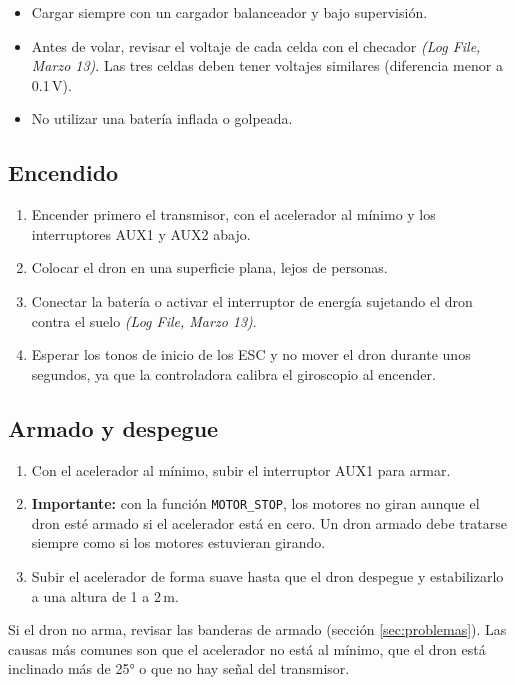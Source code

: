 \documentclass[11pt,letterpaper]{article}
\newcommand{\logref}[1]{\textit{(Log File, #1)}}
\begin{document}
\begin{itemize}[nosep]
    \item Cargar siempre con un cargador balanceador y bajo supervisión.
    \item Antes de volar, revisar el voltaje de cada celda con el checador \logref{Marzo 13}. Las tres celdas deben tener voltajes similares (diferencia menor a 0.1\,V).
    \item No utilizar una batería inflada o golpeada.
\end{itemize}

\subsection{Encendido}
\begin{enumerate}[nosep]
    \item Encender primero el transmisor, con el acelerador al mínimo y los interruptores AUX1 y AUX2 abajo.
    \item Colocar el dron en una superficie plana, lejos de personas.
    \item Conectar la batería o activar el interruptor de energía sujetando el dron contra el suelo \logref{Marzo 13}.
    \item Esperar los tonos de inicio de los ESC y no mover el dron durante unos segundos, ya que la controladora calibra el giroscopio al encender.
\end{enumerate}

\subsection{Armado y despegue}
\begin{enumerate}[nosep]
    \item Con el acelerador al mínimo, subir el interruptor AUX1 para armar.
    \item \textbf{Importante:} con la función \texttt{MOTOR\_STOP}, los motores no giran aunque el dron esté armado si el acelerador está en cero. Un dron armado debe tratarse siempre como si los motores estuvieran girando.
    \item Subir el acelerador de forma suave hasta que el dron despegue y estabilizarlo a una altura de 1 a 2\,m.
\end{enumerate}
Si el dron no arma, revisar las banderas de armado (sección \ref{sec:problemas}). Las causas más comunes son que el acelerador no está al mínimo, que el dron está inclinado más de 25° o que no hay señal del transmisor.
\end{document}
